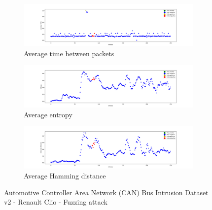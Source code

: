 \begin{figure}
    \centering
    \begin{subfigure}[b]{\linewidth}
        \includegraphics[width = \linewidth]{img/parts/app/tests/tue/RenaultClio/fuzzing/AvgTime.png}
        \caption{Average time between packets}
        \label{subfig:extract_tue_renaultclio_fuzzing_avgtime}
    \end{subfigure}
    \begin{subfigure}[b]{\linewidth}
        \includegraphics[width = \linewidth]{img/parts/app/tests/tue/RenaultClio/fuzzing/Entropy.png}
        \caption{Average entropy}
        \label{subfig:extract_tue_renaultclio_fuzzing_entropy}
    \end{subfigure}
    \begin{subfigure}[b]{\linewidth}
        \includegraphics[width = \linewidth]{img/parts/app/tests/tue/RenaultClio/fuzzing/HammingDist.png}
        \caption{Average Hamming distance}
        \label{subfig:extract_tue_renaultclio_fuzzing_hammingdist}
    \end{subfigure}
    \caption{Automotive Controller Area Network (CAN) Bus Intrusion Dataset v2 - Renault Clio - Fuzzing attack}
    \label{fig:extract_tue_renaultclio_fuzzing}
\end{figure}

